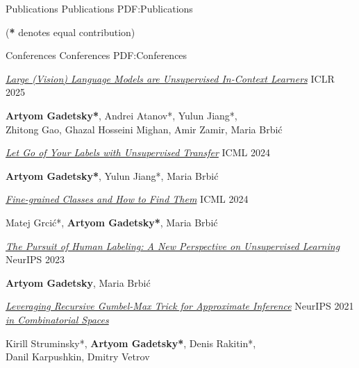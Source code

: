 \documentclass[letterpaper,MMMyyyy,nonstopmode]{simpleresumecv}
\begin{document}
\begin{Body}


\Section
{Publications}
{Publications}
{PDF:Publications}

\Entry
\hfill
(\textbf{*} denotes equal contribution)

\SubSection
{Conferences}
{Conferences}
{PDF:Conferences}
\Gap

\Entry
\href{https://openreview.net/forum?id=ohJxgRLlLt}{\textit{Large (Vision) Language Models are Unsupervised In-Context Learners}}
\hfill ICLR 2025
\begin{Detail}
\textbf{Artyom Gadetsky*}, Andrei Atanov*, Yulun Jiang*,\\ Zhitong Gao, Ghazal Hosseini Mighan, Amir Zamir, Maria Brbić
\end{Detail}
\Gap

\Entry
\href{https://proceedings.mlr.press/v235/gadetsky24a.html}{\textit{Let Go of Your Labels with Unsupervised Transfer}} \hfill ICML 2024
\begin{Detail}
\textbf{Artyom Gadetsky*}, Yulun Jiang*, Maria Brbić
\end{Detail}
\Gap

\Entry
\href{https://proceedings.mlr.press/v235/grcic24a.html}{\textit{Fine-grained Classes and How to Find Them}} \hfill ICML 2024
\begin{Detail}
Matej Grcić*, \textbf{Artyom Gadetsky*}, Maria Brbić
\end{Detail}
\Gap

\Entry
\href{https://proceedings.neurips.cc/paper_files/paper/2023/hash/be38c74290c251820e396680a82ce12d-Abstract-Conference.html}{\textit{The Pursuit of Human Labeling: A New Perspective on Unsupervised Learning}} \hfill NeurIPS 2023
\begin{Detail}
\textbf{Artyom Gadetsky}, Maria Brbić 
\end{Detail}
\Gap

\Entry
\href{https://proceedings.neurips.cc/paper/2021/hash/5b658d2a925565f0755e035597f8d22f-Abstract.html}{\textit{Leveraging Recursive Gumbel-Max Trick for Approximate Inference}} \hfill NeurIPS 2021 \\ \href{https://proceedings.neurips.cc/paper/2021/hash/5b658d2a925565f0755e035597f8d22f-Abstract.html}{\textit{in Combinatorial Spaces}}
\begin{Detail}
Kirill Struminsky*, \textbf{Artyom Gadetsky*}, Denis Rakitin*, \\ Danil Karpushkin, Dmitry Vetrov
\end{Detail}
\Gap


\end{Body}
\end{document}
